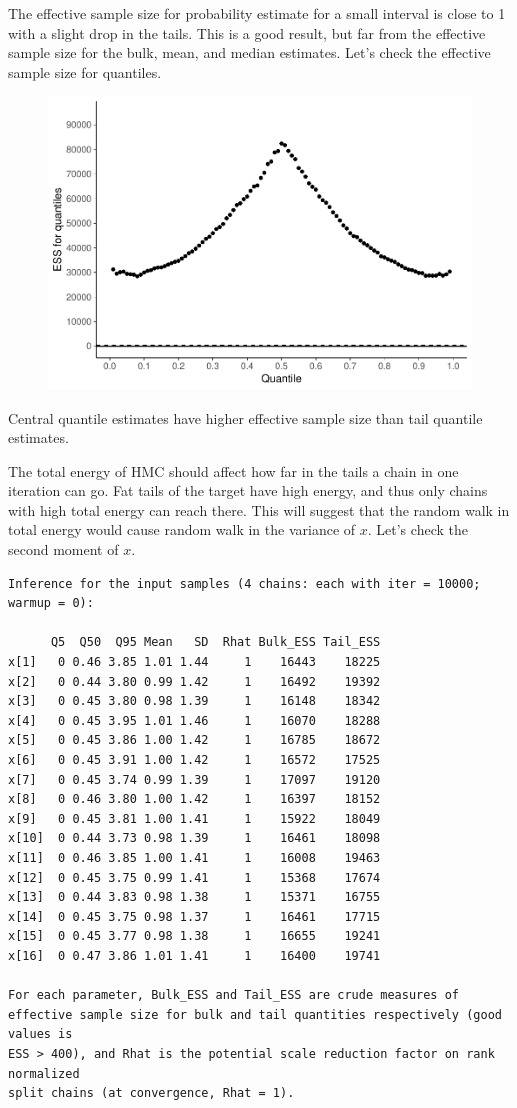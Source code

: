 \documentclass[american,]{article}
\begin{document}
The effective sample size for probability estimate for a small interval
is close to 1 with a slight drop in the tails. This is a good result,
but far from the effective sample size for the bulk, mean, and median
estimates. Let's check the effective sample size for quantiles.

\begin{figure}[t]
  \centering
  \includegraphics[width=0.6\linewidth]{graphics/quantile-ess-fit-n-1.pdf}
\end{figure}

Central quantile estimates have higher effective sample size than tail
quantile estimates.

The total energy of HMC should affect how far in the tails a chain in
one iteration can go. Fat tails of the target have high energy, and thus
only chains with high total energy can reach there. This will suggest
that the random walk in total energy would cause random walk in the
variance of \(x\). Let's check the second moment of \(x\).

\begin{verbatim}
Inference for the input samples (4 chains: each with iter = 10000; warmup = 0):

      Q5  Q50  Q95 Mean   SD  Rhat Bulk_ESS Tail_ESS
x[1]   0 0.46 3.85 1.01 1.44     1    16443    18225
x[2]   0 0.44 3.80 0.99 1.42     1    16492    19392
x[3]   0 0.45 3.80 0.98 1.39     1    16148    18342
x[4]   0 0.45 3.95 1.01 1.46     1    16070    18288
x[5]   0 0.45 3.86 1.00 1.42     1    16785    18672
x[6]   0 0.45 3.91 1.00 1.42     1    16572    17525
x[7]   0 0.45 3.74 0.99 1.39     1    17097    19120
x[8]   0 0.46 3.80 1.00 1.42     1    16397    18152
x[9]   0 0.45 3.81 1.00 1.41     1    15922    18049
x[10]  0 0.44 3.73 0.98 1.39     1    16461    18098
x[11]  0 0.46 3.85 1.00 1.41     1    16008    19463
x[12]  0 0.45 3.75 0.99 1.41     1    15368    17674
x[13]  0 0.44 3.83 0.98 1.38     1    15371    16755
x[14]  0 0.45 3.75 0.98 1.37     1    16461    17715
x[15]  0 0.45 3.77 0.98 1.38     1    16655    19241
x[16]  0 0.47 3.86 1.01 1.41     1    16400    19741

For each parameter, Bulk_ESS and Tail_ESS are crude measures of 
effective sample size for bulk and tail quantities respectively (good values is 
ESS > 400), and Rhat is the potential scale reduction factor on rank normalized
split chains (at convergence, Rhat = 1).
\end{verbatim}
\end{document}
